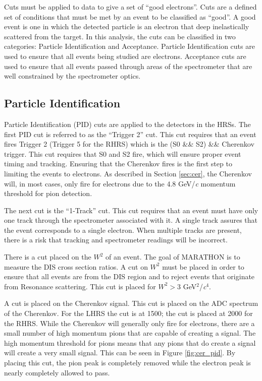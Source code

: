 Cuts must be applied to data to give a set of ``good electrons''. Cuts are a defined set of conditions that must be met by an event to be classified as ``good''. A good event is one in which the detected particle is an electron that deep inelastically scattered from the target. In this analysis, the cuts can be classified in two categories: Particle Identification and Acceptance. Particle Identification cuts are used to ensure that all events being studied are electrons. Acceptance cuts are used to ensure that all events passed through areas of the spectrometer that are well constrained by the spectrometer optics.

\subsection{Particle Identification}

Particle Identification (PID) cuts are applied to the detectors in the HRSs. The first PID cut is referred to as the ``Trigger 2'' cut. This cut requires that an event fires Trigger 2 (Trigger 5 for the RHRS) which is the (S0 \&\& S2) \&\& Cherenkov trigger. This cut requires that S0 and S2 fire, which will ensure proper event timing and tracking. Ensuring that the Cherenkov fires is the first step to limiting the events to electrons. As described in Section \ref{sec:cer}, the Cherenkov will, in most cases, only fire for electrons due to the 4.8 GeV/\textit{c} momentum threshold for pion detection.

The next cut is the ``1-Track'' cut. This cut requires that an event must have only one track through the spectrometer associated with it. A single track assures that the event corresponds to a single electron. When multiple tracks are present, there is a risk that tracking and spectrometer readings will be incorrect.

There is a cut placed on the $W^2$ of an event. The goal of MARATHON is to measure the DIS cross section ratios. A cut on $W^2$ must be placed in order to ensure that all events are from the DIS region and to reject events that originate from Resonance scattering. This cut is placed for $W^2>3$  GeV$^2$/\textit{c}$^4$.

A cut is placed on the Cherenkov signal. This cut is placed on the ADC spectrum of the Cherenkov. For the LHRS the cut is at 1500; the cut is placed at 2000 for the RHRS. While the Cherenkov will generally only fire for electrons, there are a small number of high momentum pions that are capable of creating a signal. The high momentum threshold for pions means that any pions that do create a signal will create a very small signal. This can be seen in Figure \ref{fig:cer_pid}. By placing this cut, the pion peak is completely removed while the electron peak is nearly completely allowed to pass.

